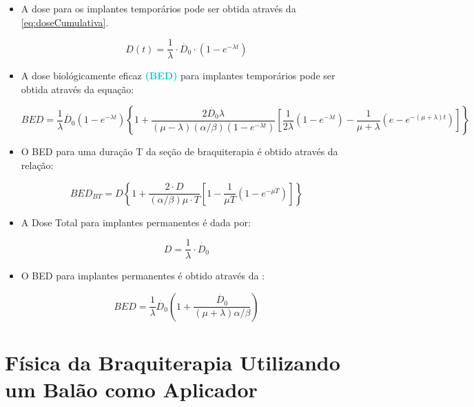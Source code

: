 \documentclass[11pt,a4paper]{article}
\begin{document}
			\begin{itemize}
		
			
				\item A dose para os implantes temporários pode ser obtida através da   \ref{eq:doseCumulativa}. 

					$$D(t) = \frac{1}{\lambda} \cdot \dot{D_0} \cdot \left(1 - e^{-\lambda t}\right)$$

				\item A dose biológicamente eficaz \textbf{\textcolor{DarkTurquoise}{(BED)}} para implantes temporários pode ser obtida através da equação:

					\begin{equation}
						BED = \frac{1}{\lambda} \dot{D_0}\left(1 - e^{-\lambda t}\right)
						\left\{ 1 + \frac{2 \dot{D_0}\lambda}{(\mu - \lambda)(\alpha / \beta) (1 - e^{-\lambda t})}
						\left[\frac{1}{2\lambda}(1 - e^{-\lambda t }) - \frac{1}{\mu + \lambda} (e - e^{-(\mu + \lambda) t})\right]\right\} 
					\end{equation}

				\item O BED para uma duração T da seção de braquiterapia é obtido através da relação:

					\begin{equation}
						BED_{BT} = D \left\{ 1 + \frac{2 \cdot D}{(\alpha / \beta)\mu \cdot T}
						\left[1 - \frac{1}{\mu T} (1 - e^{-\mu T})\right]\right\}
					\end{equation}
				
				\item A Dose Total para implantes permanentes é dada por:
					
					\begin{equation}
						D = \frac{1}{\lambda} \cdot \dot{D_0}
					\end{equation}
				
				\item O BED para implantes permanentes é obtido através da  :
					
					\begin{equation}
						BED = \frac{1}{\lambda} \dot{D_0} \left(1 + \frac{\dot{D_0}}{(\mu + \lambda) \alpha / \beta}\right)
					\end{equation}
			
			\end{itemize}


	\section{Física da Braquiterapia Utilizando um Balão como Aplicador}
\end{document}
